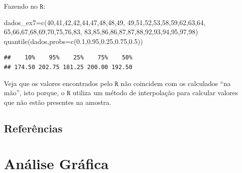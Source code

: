 \documentclass[
]{book}
\newenvironment{Shaded}{\begin{snugshade}}{\end{snugshade}}
\newcommand{\AttributeTok}[1]{\textcolor[rgb]{0.77,0.63,0.00}{#1}}
\newcommand{\DecValTok}[1]{\textcolor[rgb]{0.00,0.00,0.81}{#1}}
\newcommand{\FloatTok}[1]{\textcolor[rgb]{0.00,0.00,0.81}{#1}}
\newcommand{\FunctionTok}[1]{\textcolor[rgb]{0.00,0.00,0.00}{#1}}
\newcommand{\NormalTok}[1]{#1}
\newcommand{\OtherTok}[1]{\textcolor[rgb]{0.56,0.35,0.01}{#1}}
\begin{document}
Fazendo no \(\texttt{R}\):

\begin{Shaded}
\begin{Highlighting}[]
\NormalTok{dados\_ex7}\OtherTok{=}\FunctionTok{c}\NormalTok{(}\DecValTok{40}\NormalTok{,}\DecValTok{41}\NormalTok{,}\DecValTok{42}\NormalTok{,}\DecValTok{42}\NormalTok{,}\DecValTok{44}\NormalTok{,}\DecValTok{47}\NormalTok{,}\DecValTok{48}\NormalTok{,}\DecValTok{48}\NormalTok{,}\DecValTok{49}\NormalTok{,}
            \DecValTok{49}\NormalTok{,}\DecValTok{51}\NormalTok{,}\DecValTok{52}\NormalTok{,}\DecValTok{53}\NormalTok{,}\DecValTok{58}\NormalTok{,}\DecValTok{59}\NormalTok{,}\DecValTok{62}\NormalTok{,}\DecValTok{63}\NormalTok{,}\DecValTok{64}\NormalTok{,}
            \DecValTok{65}\NormalTok{,}\DecValTok{66}\NormalTok{,}\DecValTok{67}\NormalTok{,}\DecValTok{68}\NormalTok{,}\DecValTok{69}\NormalTok{,}\DecValTok{70}\NormalTok{,}\DecValTok{75}\NormalTok{,}\DecValTok{76}\NormalTok{,}\DecValTok{83}\NormalTok{,}
            \DecValTok{83}\NormalTok{,}\DecValTok{85}\NormalTok{,}\DecValTok{86}\NormalTok{,}\DecValTok{86}\NormalTok{,}\DecValTok{87}\NormalTok{,}\DecValTok{87}\NormalTok{,}\DecValTok{88}\NormalTok{,}\DecValTok{92}\NormalTok{,}\DecValTok{93}\NormalTok{,}\DecValTok{94}\NormalTok{,}\DecValTok{95}\NormalTok{,}\DecValTok{97}\NormalTok{,}\DecValTok{98}\NormalTok{)}
\FunctionTok{quantile}\NormalTok{(dados,}\AttributeTok{probs=}\FunctionTok{c}\NormalTok{(}\FloatTok{0.1}\NormalTok{,}\FloatTok{0.95}\NormalTok{,}\FloatTok{0.25}\NormalTok{,}\FloatTok{0.75}\NormalTok{,}\FloatTok{0.5}\NormalTok{))}
\end{Highlighting}
\end{Shaded}

\begin{verbatim}
##    10%    95%    25%    75%    50% 
## 174.50 202.75 181.25 200.00 192.50
\end{verbatim}

Veja que os valores encontrados pelo \(\texttt{R}\) não coincidem com os calculados ``na mão'', isto porque, o \(\texttt{R}\) utiliza um método de interpolação para calcular valores que não estão presentes na amostra.

\hypertarget{referuxeancias}{%
\section{Referências}\label{referuxeancias}}

\hypertarget{anuxe1lise-gruxe1fica}{%
\chapter{Análise Gráfica}\label{anuxe1lise-gruxe1fica}}
\end{document}
